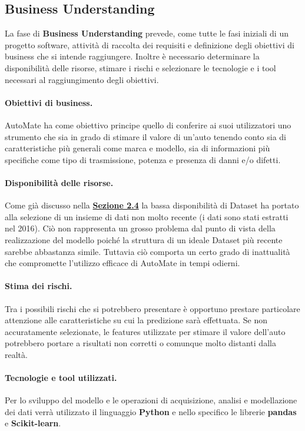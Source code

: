 \subsection{Business Understanding}
La fase di \textbf{Business Understanding} prevede, come tutte le fasi iniziali di un progetto software, attività di raccolta dei requisiti e definizione degli obiettivi di business che si intende raggiungere. Inoltre è necessario determinare la disponibilità delle risorse, stimare i rischi e selezionare le tecnologie e i tool necessari al raggiungimento degli obiettivi.

\paragraph{Obiettivi di business.}
AutoMate ha come obiettivo principe quello di conferire ai suoi utilizzatori uno strumento che sia in grado di stimare il valore di un'auto tenendo conto sia di caratteristiche più generali come marca e modello, sia di informazioni più specifiche come tipo di trasmissione, potenza e presenza di danni e/o difetti.

\paragraph{Disponibilità delle risorse.}
Come già discusso nella \hyperref[sec:problematicheDataset]{\textbf{Sezione 2.4}}
la bassa disponibilità di Dataset ha portato alla selezione di un insieme di dati non molto recente (i dati sono stati estratti nel 2016). Ciò non rappresenta un grosso problema dal punto di vista della realizzazione del modello poiché la struttura di un ideale Dataset più recente sarebbe abbastanza simile. Tuttavia ciò comporta un certo grado di inattualità che compromette l'utilizzo efficace di AutoMate in tempi odierni.

\paragraph{Stima dei rischi.}
Tra i possibili rischi che si potrebbero presentare è opportuno prestare particolare attenzione alle caratteristiche su cui la predizione sarà effettuata. Se non accuratamente selezionate, le features utilizzate per stimare il valore dell'auto potrebbero portare a risultati non corretti o comunque molto distanti dalla realtà.

\paragraph{Tecnologie e tool utilizzati.}
Per lo sviluppo del modello e le operazioni di acquisizione, analisi e modellazione dei dati verrà utilizzato il linguaggio \textbf{Python} e nello specifico le librerie \textbf{pandas} e \textbf{Scikit-learn}.
\pagebreak

